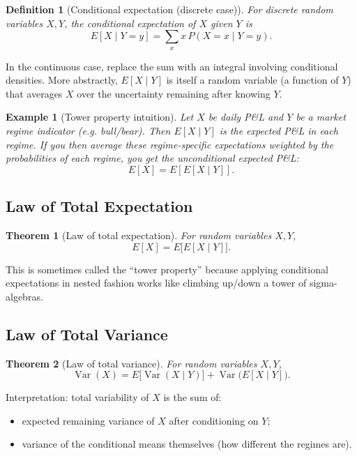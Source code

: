 \documentclass[11pt,a4paper]{article}
\newtheorem{definition}{Definition}[section]
\newtheorem{theorem}{Theorem}[section]
\newtheorem{example}{Example}[section]
\begin{document}
\begin{definition}[Conditional expectation (discrete case)]
For discrete random variables $X,Y$, the conditional expectation of $X$ given $Y$ is
\[
E[X \mid Y=y] = \sum_{x} x\, P(X=x \mid Y=y).
\]
\end{definition}

In the continuous case, replace the sum with an integral involving conditional densities. 
More abstractly, $E[X \mid Y]$ is itself a random variable (a function of $Y$) that averages $X$ over the uncertainty remaining after knowing $Y$.

\begin{example}[Tower property intuition]
Let $X$ be daily P\&L and $Y$ be a market regime indicator (e.g. bull/bear). 
Then $E[X \mid Y]$ is the expected P\&L in each regime. 
If you then average these regime-specific expectations weighted by the probabilities of each regime, you get the unconditional expected P\&L:
\[
E[X] = E[E[X \mid Y]].
\]

\end{example}

\subsection{Law of Total Expectation}

\begin{theorem}[Law of total expectation]
For random variables $X,Y$,
\[
E[X] = E\big[ E[X \mid Y] \big].
\]
\end{theorem}

This is sometimes called the ``tower property'' because applying conditional expectations in nested fashion works like climbing up/down a tower of sigma-algebras.

\subsection{Law of Total Variance}

\begin{theorem}[Law of total variance]
For random variables $X,Y$,
\[
\operatorname{Var}(X) = E\big[\operatorname{Var}(X \mid Y)\big]
+ \operatorname{Var}\big( E[X \mid Y] \big).
\]
\end{theorem}

Interpretation: total variability of $X$ is the sum of:
\begin{itemize}
    \item expected remaining variance of $X$ after conditioning on $Y$;
    \item variance of the conditional means themselves (how different the regimes are).
\end{itemize}
\end{document}
